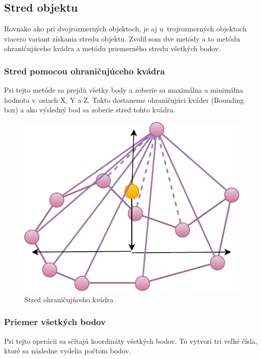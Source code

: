 \subsection*{Stred objektu}

Rovnako ako pri dvojrozmerných objektoch, je aj u~trojrozmerných objektoch viacero variant získania stredu objektu. Zvolil som dve metódy a to metódu ohraničujúceho kvádra a metódu priemerného stredu všetkých bodov.


\subsubsection{Stred pomocou ohraničujúceho kvádra}
Pri tejto metóde sa prejdú všetky body a zoberie sa maximálna a minimálna hodnota v~osiach X, Y a Z. Takto dostaneme ohraničujúci kváder (Bounding box) a ako výsledný bod sa zoberie stred tohto kvádra.
		
\begin{figure}[H]
	\centering
	\includegraphics[height=0.3\textwidth]{obrazky-figures/Diagram/Draw/1Points/DP Navrh operacii-0D - PointMiddle of 3D object.pdf}
	\caption{Stred ohraničujúceho kvádra}
	\label{fig:PointMiddle of 3D object}
\end{figure}

\subsubsection{Priemer všetkých bodov} 
Pri tejto operácii sa sčítajú koordináty všetkých bodov. To vytvorí tri veľké čísla, ktoré sa následne vydelia počtom bodov.










